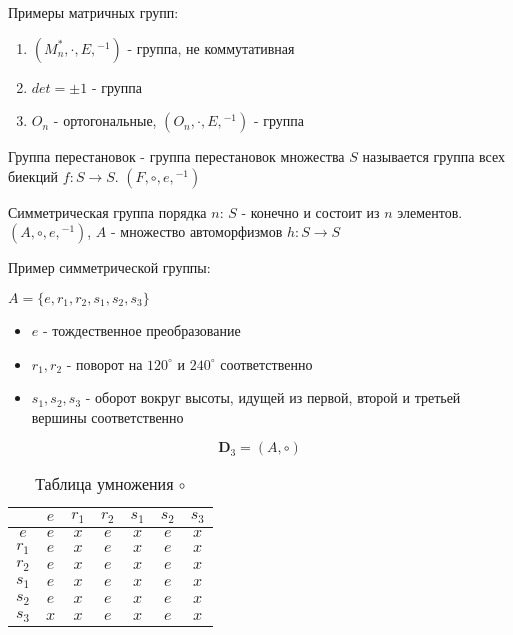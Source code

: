 \documentclass[../main/document.tex]{subfiles}
\begin{document}
\begin{exm}
Примеры матричных групп:
\begin{enumerate}
\item $(M^*_n,\cdot,E,{ }^{-1})$ - группа, не коммутативная
\item $det=\pm 1$ - группа
\item $O_n$ - ортогональные, $(O_n,\cdot,E,{ }^{-1})$ - группа
\end{enumerate}
\end{exm}
\begin{dfn}
Группа перестановок - группа перестановок множества $S$ называется группа всех биекций $f:S\rightarrow S$. $(F,\circ,e,{ }^{-1})$
\end{dfn}
\begin{exm}
\end{exm}
\begin{dfn}
Симметрическая группа порядка $n$: $S$ - конечно и состоит из $n$ элементов. $(A,\circ,e,{ }^{-1})$, $A$ - множество автоморфизмов $h:S\rightarrow S$
\end{dfn}
\begin{exm} \label{TriangleGroup}
Пример симметрической группы:


$A=\{e,r_1,r_2,s_1,s_2,s_3\}$
\begin{itemize}

  \item $e$ - тождественное преобразование
  \item $r_1, r_2$ - поворот на $120^{\circ}$ и $240^{\circ}$ соответственно
  \item $s_1, s_2, s_3$ - оборот вокруг высоты, идущей из первой, второй и третьей вершины соответственно
\end{itemize}

$$\mathbf{D}_3=(A,\circ)$$

\begin{table}[H]
\centering
\caption*{Таблица умножения $\circ$}
\renewcommand*{\arraystretch}{1.4}
\begin{tabular}{c|c|c|c|c|c|c}
  & $e$ & $r_1$ & $r_2$ & $s_1$& $s_2$ & $s_3$  \\ \hline
$e$ & $e$ & $x$ & $e$ & $x$& $e$ & $x$ \\ \hline
$r_1$ & $e$ & $x$ & $e$ & $x$& $e$ & $x$ \\ \hline
$r_2$ & $e$ & $x$ & $e$ & $x$& $e$ & $x$ \\ \hline
$s_1$ & $e$ & $x$ & $e$ & $x$& $e$ & $x$ \\ \hline
$s_2$ & $e$ & $x$ & $e$ & $x$& $e$ & $x$ \\ \hline
$s_3$ & $x$ & $x$& $e$ & $x$& $e$ & $x$ \\ 
\end{tabular}
\end{table}
\end{exm}
\end{document}
